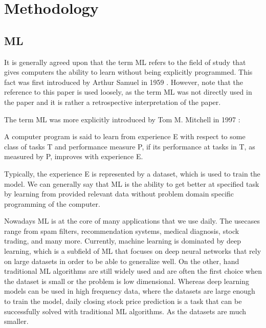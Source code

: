 \chapter{Methodology}
\label{chap:four}

\section{\acl{ML}}

It is generally agreed upon that the term 
\ac{ML} refers to the field of study that gives computers the ability to learn 
without being explicitly programmed. This fact was first 
introduced by Arthur Samuel in 1959 \cite{Samuel1959}. However, note that the reference to this paper is used
loosely, as the term \ac{ML} was not directly used in the paper and it is rather 
a retrospective interpretation of the paper. 

The term \ac{ML} was more explicitly introduced by Tom M. Mitchell in 1997 \cite{Mitchell1997}:

\begin{defin}\label{de:ml}
    A computer program is said to learn from experience E with respect
    to some class of tasks T and performance measure P, if its performance at tasks in
    T, as measured by P, improves with experience E. 
\end{defin}

Typically, the experience E is represented by a dataset, which is used to train the model. 
We can generally say that \ac{ML} is the ability to get better at specified task by learning
from provided relevant data without problem domain specific programming of the computer.


Nowadays \ac{ML} is at the core of many applications that we use daily. The usecases range from
spam filters, recommendation systems, medical diagnosis, stock trading, and many more. Currently, 
machine learning is dominated by deep learning, which is a subfield of \ac{ML} that focuses on
deep neural networks that rely on large datasets in order to be able to generalize well.
On the other, hand traditional \ac{ML} algorithms are still widely used and are often the first choice
when the dataset is small or the problem is low dimensional. Whereas deep learning models
can be used in high frequency data, where the datasets are large enough to train the model, 
daily closing stock price prediction is a task that can be successfully solved with 
traditional \ac{ML} algorithms. As the datasets are much smaller. 


